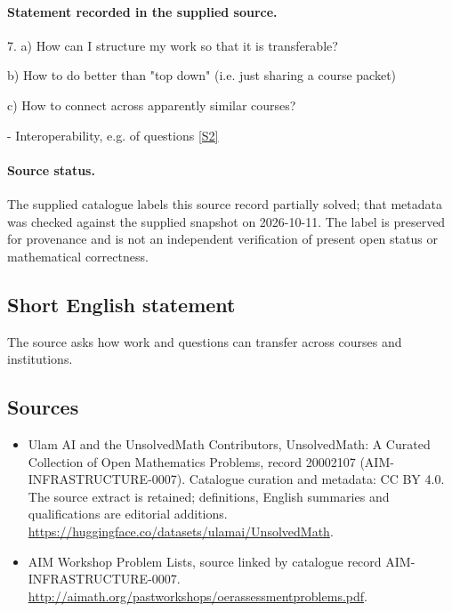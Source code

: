 \documentclass[11pt]{article}
\begin{document}
\paragraph{Statement recorded in the supplied source.}
7. a) How can I structure my work so that it is transferable?

b) How to do better than "top down" (i.e. just sharing a course packet)

c) How to connect across apparently similar courses?

- Interoperability, e.g. of questions \href{http://aimath.org/pastworkshops/oerassessmentproblems.pdf}{[S2]}
\paragraph{Source status.}
The supplied catalogue labels this source record partially solved; that metadata was checked against the supplied snapshot on 2026-10-11. The label is preserved for provenance and is not an independent verification of present open status or mathematical correctness.
\subsection{Short English statement}
The source asks how work and questions can transfer across courses and institutions.
\subsection{Sources}
\begin{itemize}
\item[S1] Ulam AI and the UnsolvedMath Contributors, UnsolvedMath: A Curated Collection of Open Mathematics Problems, record 20002107 (AIM-INFRASTRUCTURE-0007). Catalogue curation and metadata: CC BY 4.0. The source extract is retained; definitions, English summaries and qualifications are editorial additions.
\url{https://huggingface.co/datasets/ulamai/UnsolvedMath}.
\item[S2] AIM Workshop Problem Lists, source linked by catalogue record AIM-INFRASTRUCTURE-0007.
\url{http://aimath.org/pastworkshops/oerassessmentproblems.pdf}.
\end{itemize}
\end{document}
